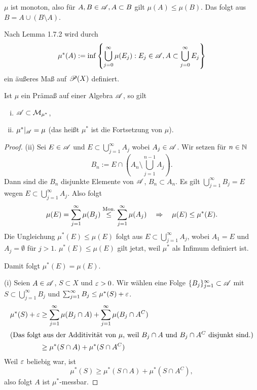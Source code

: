 \begin{rmrk*}
 $\mu$ ist monoton, also für $A, B \in \mathscr{A}, A \subset B$ gilt $\mu(A) \le \mu(B)$. Das folgt aus $B = A \cup (B \setminus A)$.
\end{rmrk*}

Nach Lemma 1.7.2 wird durch
\[ \mu^*(A) := \inf \left\{ \bigcup_{j=0}^\infty \mu(E_j) : E_j \in \mathscr{A}, A \subset \bigcup_{j=0}^\infty E_j \right \} \]
ein äußeres Maß  auf $\mathscr{P}(X)$ definiert.

\begin{lem}
 Ist $\mu$ ein Prämaß auf einer Algebra $\mathscr{A}$, so gilt
 \begin{enumerate}[(i)]
  \item $\mathscr{A} \subset \mathcal{M}_{\mu^*}$,
  \item $\mu^* |_{\mathscr{A}} = \mu$ (das heißt $\mu^*$ ist die Fortsetzung von $\mu$).
 \end{enumerate}
\end{lem}

\begin{proof}
 (ii) Sei $E \in \mathscr{A}$ und $E \subset \bigcup_{j=1}^\infty A_j$ wobei $A_j \in \mathscr{A}$. Wir setzen für $n \in \mathbb{N}$
 \[ B_n := E \cap \left( A_n \setminus \bigcup_{j = 1}^{n-1} A_j \right). \]
 Dann sind die $B_n$ disjunkte Elemente von $\mathscr{A}$, $B_n \subset A_n$. Es gilt $\bigcup_{j=1}^\infty B_j = E$ wegen $E \subset \bigcup_{j=1}^\infty A_j$. Also folgt
 \[ \mu(E) = \sum_{j=1}^\infty \mu(B_j) \overset{\text{Mon.}}{\le} \sum_{j=1}^\infty \mu(A_j) \quad \Rightarrow \quad \mu(E) \le \mu^*(E). \]
 Die Ungleichung $\mu^*(E) \le \mu(E)$ folgt aus $E \subset \bigcup_{j=1}^\infty A_j$, wobei $A_1 = E$ und $A_j = \emptyset$ für $j > 1$. $\mu^*(E) \le \mu(E)$ gilt jetzt, weil $\mu^*$ als Infimum definiert ist.
 
 Damit folgt $\mu^*(E) = \mu(E)$.
 
 (i) Seien $A \in \mathscr{A}$, $S \subset X$ und $\varepsilon > 0$. Wir wählen eine Folge $\{ B_j \}_{j=1}^\infty \subset \mathscr{A}$ mit $S \subset \bigcup_{j=1}^\infty B_j$ und $\sum_{j=1}^\infty B_j \le \mu^*(S) + \varepsilon$.
 \begin{align*}
  \mu^*(S) + \varepsilon &\ge \sum_{j=1}^\infty \mu(B_j \cap A) + \sum_{j=1}^\infty \mu(B_j \cap A^C ) \\
  \intertext{(Das folgt aus der Additivität von $\mu$, weil $B_j \cap A$ und $B_j \cap A^C$ disjunkt sind.)}
  &\ge \mu^*( S \cap A ) + \mu^*( S \cap A^C )
 \end{align*}
 Weil $\varepsilon$ beliebig war, ist
 \[ \mu^*(S) \ge \mu^*(S \cap A) + \mu^*(S \cap A^C), \]
 also folgt $A$ ist $\mu^*$-messbar.
\end{proof}

